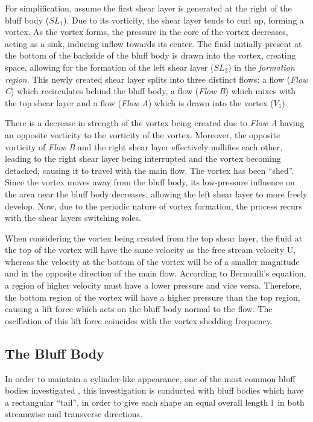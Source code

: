 For simplification, assume the first shear layer is generated at the right of the bluff body ($SL_{1}$). Due to its vorticity, the shear layer tends to curl up, forming a vortex. As the vortex forms, the pressure in the core of the vortex decreases, acting as a sink, inducing inflow towards its center. The fluid initially present at the bottom of the backside of the bluff body is drawn into the vortex, creating space, allowing for the formation of the left shear layer ($SL_{2}$) in the \textit{formation region}. This newly created shear layer splits into three distinct flows: a flow (\textit{Flow C}) which recirculates behind the bluff body, a flow (\textit{Flow B}) which mixes with the top shear layer and a flow (\textit{Flow A}) which is drawn into the vortex ($V_{1}$).

There is a decrease in strength of the vortex being created due to \textit{Flow A} having an opposite vorticity to the vorticity of the vortex. Moreover, the opposite vorticity of \textit{Flow B} and the right shear layer effectively nullifies each other, leading to the right shear layer being interrupted and the vortex becoming detached, causing it to travel with the main flow. The vortex has been “shed”. Since the vortex moves away from the bluff body, its low-pressure influence on the area near the bluff body decreases, allowing the left shear layer to more freely develop. Now, due to the periodic nature of vortex formation, the process recurs with the shear layers switching roles. 

When considering the vortex being created from the top shear layer, the fluid at the top of the vortex will have the same velocity as the free stream velocity U, whereas the velocity at the bottom of the vortex will be of a smaller magnitude and in the opposite direction of the main flow. According to Bernoulli’s equation, a region of higher velocity must have a lower pressure and vice versa. Therefore, the bottom region of the vortex will have a higher pressure than the top region, causing a lift force which acts on the bluff body normal to the flow. The oscillation of this lift force coincides with the vortex shedding frequency. 

\subsection{The Bluff Body}
\label{sec:bluffBody}
In order to maintain a cylinder-like appearance, one of the most common bluff bodies investigated \parencite[475]{rocchi2002_vortex}, this investigation is conducted with bluff bodies which have a rectangular “tail”, in order to give each shape an equal overall length l\ in both streamwise and transverse directions.


